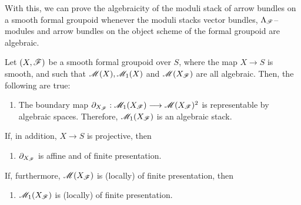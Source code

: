 \documentclass[11pt]{amsart}
\begin{document}
With this, we can prove the algebraicity of the moduli stack of
arrow bundles on a smooth formal groupoid whenever the moduli stacks
vector bundles, $\Lambda_\mathscr{F}$--modules and arrow bundles on the object
scheme of the formal groupoid are algebraic.

\begin{thm}\label{thm:mod-st-arr-bun-formal-grpd-alg}
Let $(X, \mathscr{F})$ be a smooth formal groupoid over $S$, where the map $X \to S$ is
smooth, and such that $\mathscr{M}(X), \mathscr{M}_1(X)$ and $\mathscr{M}(X_\mathscr{F})$ are all algebraic.
Then, the following are true:
\begin{enumerate}
\item The boundary map $\partial_{X_\sF} : \sM_1(X_\sF) \to \sM(X_\sF)^2$ is
representable by algebraic spaces. Therefore, $\mathscr{M}_1(X_\mathscr{F})$ is an algebraic
stack.
\end{enumerate}
If, in addition, $X \to S$ is projective, then
\begin{enumerate}[resume]
\item $\partial_{X_\mathscr{F}}$ is affine and of finite presentation.
\end{enumerate}
If, furthermore, $\mathscr{M}(X_\mathscr{F})$ is (locally) of finite presentation, then
\begin{enumerate}[resume]
\item $\mathscr{M}_1(X_\mathscr{F})$ is (locally) of finite presentation.
\end{enumerate}
\end{thm}
\end{document}
